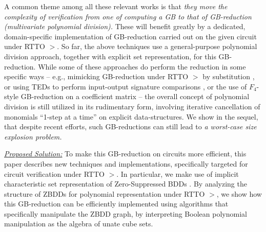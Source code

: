 A common theme among all these relevant works is that {\it they move
  the complexity of verification from one of computing a GB to that of 
  GB-reduction (multivariate polynomial division).} These
will benefit greatly by a dedicated, domain-specific implementation of
GB-reduction carried out on the given circuit under RTTO $>$. So far,
the above techniques 
\cite{wienand:cav08,pruss:tcad,lv:tcad2013,rolf:date16,ciesielski:dac2015,cunxi:aspdac17} use a
general-purpose polynomial division approach, together with explicit
set representation, for this GB-reduction. While some of these
approaches %
do perform the reduction in some specific ways -- e.g., mimicking
GB-reduction under RTTO $>$ by substitution \cite{rolf:date16}, or using
TEDs to perform input-output signature comparisons \cite{ciesielski:dac2015},
or the use of $F_4$-style GB-reduction on a coefficient matrix
\cite{lv:tcad2013} -- the overall concept of polynomial division is
still utilized in its rudimentary form, involving iterative
cancellation of monomials ``1-step at a time'' on explicit
data-structures. We show in the sequel, that despite recent efforts,
such GB-reductions can still lead to {\it a worst-case size explosion
  problem.} 


\underline{\it Proposed Solution:} To make this GB-reduction on
circuits more efficient, this paper describes new techniques and
implementations, specifically targeted for
circuit verification under RTTO $>$.  In
particular, we make use of implicit characteristic set representation
of Zero-Suppressed BDDs \cite{zbdd}. By analyzing the structure of
ZBDDs for polynomial representation under RTTO $>$, we show how this
GB-reduction can be efficiently implemented using algorithms that 
specifically manipulate the ZBDD graph, by interpreting Boolean
polynomial manipulation as the algebra of unate cube sets. 

